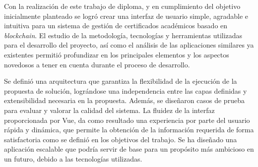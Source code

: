 \begin{conclusions}
Con la realización de este trabajo de diploma, y en cumplimiento del objetivo inicialmente planteado se logró crear una interfaz de usuario simple, agradable e intuitiva para un sistema de gestión de certificados académicos basado en \textit{blockchain}. El estudio de la metodología, tecnologías y herramientas utilizadas para el desarrollo del proyecto, así como el análisis de las aplicaciones similares ya existentes permitió profundizar en los principales elementos y los aspectos novedosos a tener en cuenta durante el proceso de desarrollo.



Se definió una arquitectura que garantiza la flexibilidad de la ejecución de la propuesta de solución, lográndose una independencia entre las capas definidas y extensibilidad necesaria en la propuesta. Además, se diseñaron casos de prueba para evaluar y valorar la calidad del sistema. La fluidez de la interfaz proporcionada por Vue, da como resultado una experiencia por parte del usuario rápida y dinámica, que permite la obtención de la información requerida de forma satisfactoria como se definió en los objetivos del trabajo. Se ha diseñado una aplicación escalable que podría servir de base para un propósito más ambicioso en un futuro, debido a las tecnologías utilizadas.


\end{conclusions}
